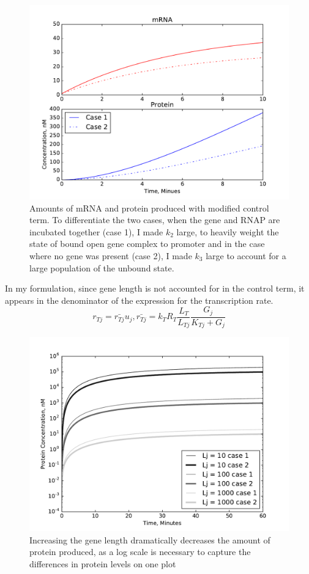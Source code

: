 \documentclass{article}
\begin{document}
\begin{figure}[!htb]
\includegraphics[width=12cm]{../Problem1/Problem1NotQuiteLinear}
\caption{Amounts of mRNA and protein produced with modified control term. To differentiate the two cases, when the gene and RNAP are incubated together (case 1), I made $k_2$ large, to heavily weight the state of bound open gene complex to promoter and in the case where no gene was present (case 2), I made $k_3$ large to account for a large population of the unbound state.}
\label{fig:P1Transcription}
\end{figure}
In my formulation, since gene length is not accounted for in the control term, it appears in the denominator of the expression for the transcription rate. 
\begin{equation}
r_{Tj} = \bar{r_{Tj}}u_j, 
\bar{r_{Tj}}= k_TR_T\frac{L_T}{L_{Tj}}\frac{G_j}{K_{Tj} + G_j}
\end{equation}
\begin{figure}[!htb]
\includegraphics[width=12cm]{../Problem1/EffectsOfGeneLength}
\caption{Increasing the gene length dramatically decreases the amount of protein produced, as a log scale is necessary to capture the differences in protein levels on one plot}
\label{fig:P1GeneLen}
\end{figure}
\end{document}
